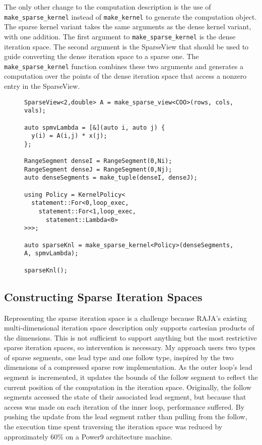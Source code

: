 The only other change to the computation description is the use of \verb.make_sparse_kernel. instead of \verb.make_kernel. to generate the computation object.
The sparse kernel variant takes the same arguments as the dense kernel variant, with one addition.
The first argument to \verb.make_sparse_kernel. is the dense iteration space.
The second argument is the SparseView that should be used to guide converting the dense iteration space to a sparse one.
The \verb.make_sparse_kernel. function combines these two arguments and generates a computation over the points of the dense iteration space that access a nonzero entry in the SparseView.

\begin{figure}
\begin{lstlisting}[caption={SpMV kernel written using the SparseRAJA prototype interface. Changes from the dense implementation are highlighted.},label=SparseRAJASpMV]
SparseView<2,double> A = make_sparse_view<COO>(rows, cols, vals);

auto spmvLambda = [&](auto i, auto j) {
  y(i) = A(i,j) * x(j);
};

RangeSegment denseI = RangeSegment(0,Ni);
RangeSegment denseJ = RangeSegment(0,Nj);
auto denseSegments = make_tuple(denseI, denseJ);

using Policy = KernelPolicy<
  statement::For<0,loop_exec,
    statement::For<1,loop_exec,
      statement::Lambda<0>
>>>;

auto sparseKnl = make_sparse_kernel<Policy>(denseSegments, A, spmvLambda);

sparseKnl();
\end{lstlisting}
\end{figure}


\subsection{Constructing Sparse Iteration Spaces}\label{sec:SparseSegments}
Representing the sparse iteration space is a challenge because RAJA's existing multi-dimensional iteration space description only supports cartesian products of the dimensions.
This is not sufficient to support anything but the most restrictive sparse iteration spaces, so intervention is necessary.
My approach users two types of sparse segments, one lead type and one follow type, inspired by the two dimensions of a compressed sparse row implementation.
As the outer loop's lead segment is incremented, it updates the bounds of the follow segment to reflect the current position of the computation in the iteration space.
Originally, the follow segments accessed the state of their associated lead segment, but because that access was made on each iteration of the inner loop, performance suffered. 
By pushing the update from the lead segment rather than pulling from the follow, the execution time spent traversing the iteration space was reduced by approximately 60\% on a Power9 architecture machine.

